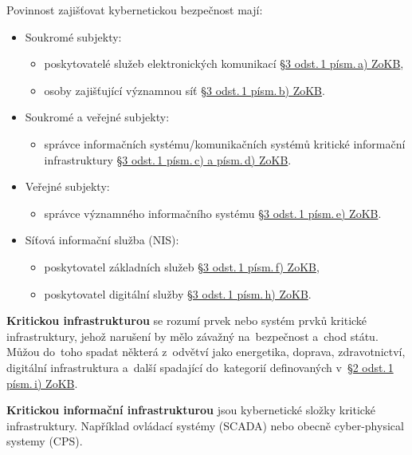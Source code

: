 Povinnost zajišťovat kybernetickou bezpečnost mají:
\begin{itemize}
    \item Soukromé subjekty:
          \begin{itemize}
              \item poskytovatelé služeb elektronických komunikací \href{https://www.zakonyprolidi.cz/cs/2014-181#p3-1-a}{§3 odst.\,1 písm.\,a) ZoKB},
              \item osoby zajišťující významnou síť \href{https://www.zakonyprolidi.cz/cs/2014-181#p3-1-b}{§3 odst.\,1 písm.\,b) ZoKB}.
          \end{itemize}
    \item Soukromé a veřejné subjekty:
          \begin{itemize}
              \item správce informačních systému/komunikačních systémů kritické informační infrastruktury \href{https://www.zakonyprolidi.cz/cs/2014-181#p3-1-c}{§3 odst.\,1 písm.\,c) a písm.\,d) ZoKB}.
          \end{itemize}
    \item Veřejné subjekty:
          \begin{itemize}
              \item správce významného informačního systému \href{https://www.zakonyprolidi.cz/cs/2014-181#p3-1-e}{§3 odst.\,1 písm.\,e) ZoKB}.
          \end{itemize}
    \item Síťová informační služba (NIS):
          \begin{itemize}
              \item poskytovatel základních služeb \href{https://www.zakonyprolidi.cz/cs/2014-181#p3-1-f}{§3 odst.\,1 písm.\,f) ZoKB},
              \item poskytovatel digitální služby \href{https://www.zakonyprolidi.cz/cs/2014-181#p3-1-h}{§3 odst.\,1 písm.\,h) ZoKB}.
          \end{itemize}
\end{itemize}

\textbf{Kritickou infrastrukturou} se rozumí prvek nebo systém prvků kritické infrastruktury, jehož narušení by mělo závažný na~bezpečnost a~chod státu. Můžou do~toho spadat některá z~odvětví jako energetika, doprava, zdravotnictví, digitální infrastruktura a~další spadající do~kategorií definovaných v~\href{https://www.zakonyprolidi.cz/cs/2014-181\#p2-1-i}{§2 odst.\,1 písm.\,i) ZoKB}.

\textbf{Kritickou informační infrastrukturou} jsou kybernetické složky kritické infrastruktury. Například ovládací systémy (SCADA) nebo obecně cyber-physical systemy (CPS).

